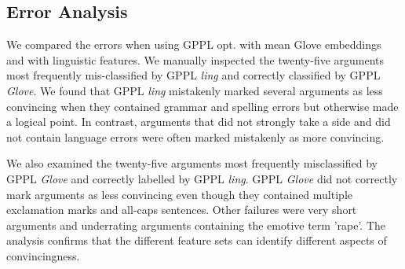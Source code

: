 \subsection{Error Analysis}

We compared the errors when using GPPL opt. with mean Glove embeddings
and with linguistic features. We
manually inspected the twenty-five arguments most frequently
mis-classified by GPPL \emph{ling} and correctly classified by GPPL \emph{Glove}.
We found that GPPL \emph{ling} mistakenly marked several arguments 
as less convincing when they contained grammar and spelling errors but otherwise
made a logical point. 
In contrast, arguments that did not strongly take a side and did not contain 
language errors were often marked mistakenly as more convincing.

We also examined the twenty-five arguments most frequently misclassified by GPPL \emph{Glove} and correctly labelled by GPPL \emph{ling}.
GPPL \emph{Glove} did not correctly mark arguments as less convincing 
even though they contained multiple exclamation marks and all-caps sentences. 
Other failures were very short arguments and underrating arguments containing the emotive term 'rape'.
The analysis confirms that the different feature sets can identify different aspects of convincingness.

